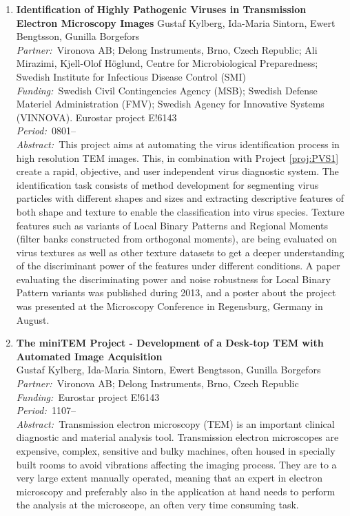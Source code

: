 \documentclass[10pt, a4paper]{article}
\newcommand{\aabstract}[1]{\emph{Abstract:~}#1}
\newcommand{\ffunding}[1]{\emph{Funding:~}#1\\}
\newcommand{\ppartner}[1]{\emph{Partner:~}#1\\}
\newcommand{\pperiod}[1]{\emph{Period:~}#1\\}
\begin{document}
\begin{enumerate}
\item
\textbf{Identification of Highly Pathogenic Viruses in Transmission Electron Microscopy Images} \label{proj:PVS2}
Gustaf Kylberg, Ida-Maria Sintorn, Ewert Bengtsson, Gunilla Borgefors\\
\ppartner{Vironova AB; Delong Instruments, Brno, Czech Republic; Ali Mirazimi, Kjell-Olof H\"{o}glund, Centre for Microbiological Preparedness; Swedish Institute for Infectious Disease Control (SMI)}
\ffunding{Swedish Civil Contingencies Agency (MSB); Swedish Defense Materiel Administration (FMV); Swedish Agency for Innovative Systems (VINNOVA). Eurostar project E!6143}
\pperiod{0801--}
\aabstract{This project aims at automating the virus identification process in high resolution TEM images. This, in combination with Project \ref{proj:PVS1} create a rapid, objective, and user independent virus diagnostic system. The identification task consists of method development for segmenting virus particles with different shapes and sizes and extracting descriptive features of both shape and texture to enable the classification into virus species. Texture features such as variants of Local Binary Patterns and Regional Moments (filter banks constructed from orthogonal moments), are being evaluated on virus textures as well as other texture datasets to get a deeper understanding of the discriminant power of the features under different conditions. A paper evaluating the discriminating power and noise robustness for Local Binary Pattern variants was published during 2013, and a poster about the project was presented at the Microscopy Conference in Regensburg, Germany in August.} 


\item
\textbf{The miniTEM Project - Development of a Desk-top TEM with Automated Image Acquisition}\\ \label{proj:PVS1}
Gustaf Kylberg, Ida-Maria Sintorn, Ewert Bengtsson, Gunilla Borgefors\\
\ppartner{Vironova AB; Delong Instruments, Brno, Czech Republic}
\ffunding{Eurostar project E!6143}
\pperiod{1107--}
\aabstract{Transmission electron microscopy (TEM) is an important clinical diagnostic and material analysis tool. Transmission electron microscopes are expensive, complex, sensitive and bulky machines, often housed in specially built rooms to avoid vibrations affecting the imaging process. They are to a very large extent manually operated, meaning that an expert in electron microscopy and preferably also in the  application at hand needs to perform the analysis at the microscope, an often very time consuming task. 
 
}
\end{enumerate}
\end{document}
